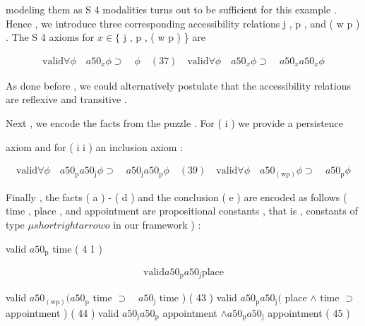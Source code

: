 \documentclass[10pt]{article}
\begin{document}
\noindent modeling them as S 4 modalities turns out to be sufficient for this example . 
 Hence , we introduce three corresponding accessibility relations j , p , and ( w p ) . 
 The S 4 axioms for  $ x   \in   \{ $  j , p , ( w p ) \} are 

\begin{align*}
 \mathrm{valid}   \forall  \phi  \quad  a50 _{ x }  \phi   \supset  \quad  \phi  \quad  (  37  )  \quad  \mathrm{valid}   \forall  \phi  \quad  a50 _{ x }  \phi   \supset  \quad  a50 _{ x }  a50 _{ x }  \phi \tag*{$ (  38  ) $}
\end{align*}

\noindent As done before , we could alternatively postulate that the accessibility relations 
 are reflexive and transitive . 

\hspace*{\fill}Next , we encode the facts from the puzzle . For ( i ) we provide a persistence 

\noindent axiom and for ( i i ) an inclusion axiom : 

\begin{align*}
 \mathrm{valid}   \forall  \phi  \quad  a50 _{ \mathrm{p} }  a50 _{ \mathrm{j} }  \phi   \supset  \quad  a50 _{ \mathrm{j} }  a50 _{ \mathrm{p} }  \phi  \quad  (  39  )  \quad  \mathrm{valid}   \forall  \phi  \quad  a50 _{ (  \mathrm{w}  \mathrm{p}  ) }  \phi   \supset  \quad  a50 _{ \mathrm{p} }  \phi \tag*{$ (  40  ) $}
\end{align*}

Finally , the facts ( a ) - ( d ) and the conclusion ( e ) are encoded as follows ( time , 
 place , and appointment are propositional constants , that is , constants of type 
  $ \mu   shortrightarrow   o $  in our framework ) : 

\hspace*{\fill}valid  $ a50 _{ \mathrm{p} }$  time \quad ( 4 1 ) 

\begin{align*}
 \mathrm{valid}   a50 _{ \mathrm{p} }  a50 _{ \mathrm{j} }  \mathrm{place} \tag*{$ (  42  ) $}
\end{align*}

valid  $ a50 _{ (  \mathrm{w}  \mathrm{p}  ) }  (  a50 _{ \mathrm{p} }$  time  $ \supset  \quad  a50 _{ \mathrm{j} }$  time ) \quad ( 43 ) 
 valid  $ a50 _{ \mathrm{p} }  a50 _{ \mathrm{j} }  ( $  place  $ \wedge $  time  $ \supset $  \quad appointment ) \quad ( 44 ) 
 valid  $ a50 _{ \mathrm{j} }  a50 _{ \mathrm{p} }$  appointment  $ \wedge   a50 _{ \mathrm{p} }  a50 _{ \mathrm{j} }$  appointment \quad ( 45 ) 
\end{document}

